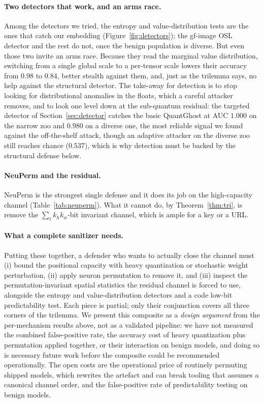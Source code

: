 \documentclass[10pt,journal]{IEEEtran}
\theoremstyle{remark}
\newcommand{\sys}{\mbox{QuantGhost}}
\begin{document}
\paragraph{Two detectors that work, and an arms race.} Among the detectors we tried,
the entropy and value-distribution tests are the ones that catch our embedding
(Figure~\ref{fig:detectors}); the gf-image OSL detector and the rest do not, once the
benign population is diverse. But even those two invite an arms race. Because they read
the marginal value distribution, switching from a single global scale to a per-tensor
scale lowers their accuracy from $0.98$ to $0.84$, better stealth against them, and,
just as the trilemma says, no help against the structural detector. The take-away for
detection is to stop looking for distributional anomalies in the floats, which a careful
attacker removes, and to look one level down at the sub-quantum residual: the targeted
detector of Section~\ref{sec:detector} catches the basic \sys{} at AUC $1.000$ on the
narrow zoo and $0.980$ on a diverse one, the most reliable signal we found against the
off-the-shelf attack, though an adaptive attacker on the diverse zoo still reaches chance
($0.537$), which is why detection must be backed by the structural defense below.

\paragraph{NeuPerm and the residual.} NeuPerm is the strongest single defense and it
does its job on the high-capacity channel (Table~\ref{tab:neuperm}). What it cannot do,
by Theorem~\ref{thm:tri}, is remove the $\sum_\ell k_h k_w$-bit invariant channel,
which is ample for a key or a URL.

\paragraph{What a complete sanitizer needs.} Putting these together, a defender who
wants to actually close the channel must (i) bound the positional capacity with heavy
quantization or stochastic weight perturbation, (ii) apply neuron permutation to remove
it, and (iii) inspect the permutation-invariant spatial statistics the residual channel
is forced to use, alongside the entropy and value-distribution detectors and a code
low-bit predictability test. Each piece is partial; only their conjunction covers all
three corners of the trilemma. We present this composite as a \emph{design argument} from the
per-mechanism results above, not as a validated pipeline: we have not measured the combined
false-positive rate, the accuracy cost of heavy quantization plus permutation applied together,
or their interaction on benign models, and doing so is necessary future work before the
composite could be recommended operationally. The open costs are the operational price of
routinely permuting shipped models, which rewrites the artefact and can break tooling that
assumes a canonical channel order, and the false-positive rate of predictability testing on
benign models.
\end{document}
